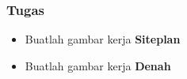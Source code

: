 \documentclass[../spa_2.tex]{subfiles}
\begin{document}
\begin{frame}[mytitle=standard,t,mybg=bglight3,light]
	\frametitle{Tugas}

	\begin{itemize}
		\item Buatlah gambar kerja \textbf{Siteplan}
		\item Buatlah gambar kerja \textbf{Denah}
	\end{itemize}

\end{frame}


\end{document}
